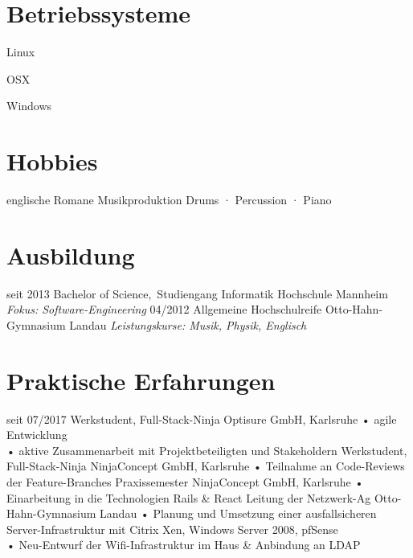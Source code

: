 \documentclass[
]{friggeri-cv}
\begin{document}
\begin{aside}
  \section{Betriebssysteme}
  \parbox[t]{1.5cm}{Linux} \color{orange}{\Smiley\Smiley\Smiley}
  \parbox[t]{1.5cm}{OSX} \color{orange}{\Smiley\Smiley}
  \parbox[t]{1.5cm}{Windows} \color{orange}{\Smiley}
  \section{Hobbies}
    englische Romane
    Musikproduktion
    Drums · Percussion · Piano
\end{aside}

\section{Ausbildung}

\begin{entrylist}
  \entry
    {seit 2013}
    {Bachelor of Science{\normalfont ,~Studiengang Informatik}}
    {Hochschule Mannheim}
    {\emph{Fokus: Software-Engineering}}
  \entry
    {04/2012}
    {Allgemeine Hochschulreife {\normalfont }}
    {Otto-Hahn-Gymnasium Landau}
    {\emph{Leistungskurse: Musik, Physik, Englisch}}
\end{entrylist}

\section{Praktische Erfahrungen}

\begin{entrylist}
  \entry
    {seit 07/2017}
    {Werkstudent, Full-Stack-Ninja}
    {Optisure GmbH, Karlsruhe}
    {%
      • agile Entwicklung\\
      • aktive Zusammenarbeit mit Projektbeteiligten und Stakeholdern
    }
  \entry
    {}
    {Werkstudent, Full-Stack-Ninja}
    {NinjaConcept GmbH, Karlsruhe}
    {%
      • Teilnahme an Code-Reviews der Feature-Branches
    }
  \entry
    {}
    {Praxissemester}
    {NinjaConcept GmbH, Karlsruhe}
    {%
      • Einarbeitung in die Technologien Rails \& React
    }
  \entry
    {}
    {Leitung der Netzwerk-Ag}
    {Otto-Hahn-Gymnasium Landau}
    {%
      • Planung und Umsetzung einer ausfallsicheren Server-Infrastruktur mit Citrix Xen, Windows Server 2008, pfSense\\
      • Neu-Entwurf der Wifi-Infrastruktur im Haus \& Anbindung an LDAP
    }
\end{entrylist}
\end{document}
